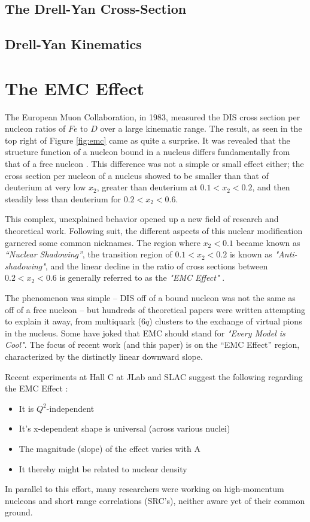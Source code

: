 \subsection{The Drell-Yan Cross-Section}

\subsection{Drell-Yan Kinematics}

\section{The EMC Effect}

The European Muon Collaboration, in 1983, measured the DIS cross section per nucleon ratios of $Fe$ to $D$ over a large kinematic range.  The result, as seen in the top right of Figure \ref{fig:emc} came as quite a surprise.  It was revealed that the structure function of a nucleon bound in a nucleus differs fundamentally from that of a free nucleon  \cite{Aubert:1983xm}.  This difference was not a simple or small effect either; the cross section per nucleon of a nucleus showed to be smaller than that of deuterium at very low $x_2$, greater than deuterium at $0.1<x_2<0.2$, and then steadily less than deuterium for $0.2<x_2<0.6$. 

This complex, unexplained behavior opened up a new field of research and theoretical work. Following suit, the different aspects of this nuclear modification garnered some common nicknames.  The region where $x_2<0.1$ became known as \emph{``Nuclear Shadowing''}, the transition region of $0.1<x_2<0.2$ is known as \emph{"Anti-shadowing"}, and the linear decline in the ratio of cross sections between $0.2<x_2<0.6$ is generally referred to as the \emph{"EMC Effect"} \cite{Geesaman:1995yd}.

The phenomenon was simple -- DIS off of a bound nucleon was not the same as off of a free nucleon -- but hundreds of theoretical papers were written attempting to explain it away, from multiquark ($6q$) clusters to the exchange of virtual pions in the nucleus. Some have joked that EMC should stand for \emph{"Every Model is Cool"}. The focus of recent work (and this paper) is on the ``EMC Effect'' region, characterized by the distinctly linear downward slope.

Recent experiments at Hall C at JLab and SLAC suggest the following regarding the EMC Effect \cite{Seely:2009gt}:
\begin{itemize}
	\item
	It is $Q^2$-independent
	\item
	It's x-dependent shape is universal (across various nuclei)
	\item
	The magnitude (slope) of the effect varies with A
	\item
	It thereby might be related to nuclear density
\end{itemize}

In parallel to this effort, many researchers were working on high-momentum nucleons and short range correlations (SRC's), neither aware yet of their common ground.